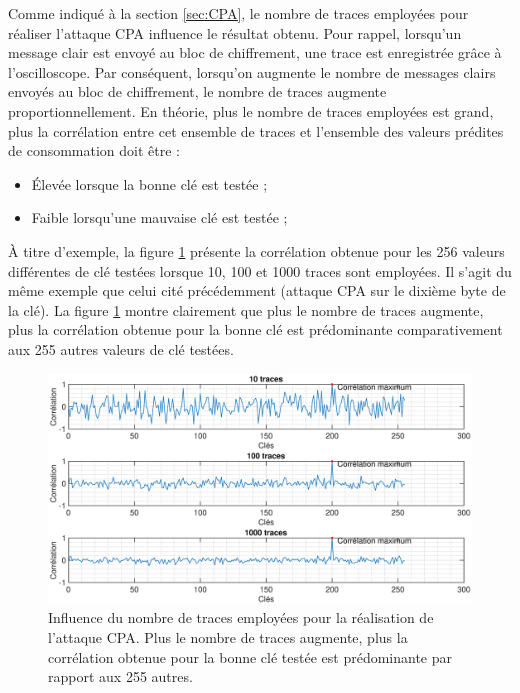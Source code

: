 \documentclass[oneside]{book}
\begin{document}
\newpage

Comme indiqué à la section \ref{sec:CPA}, le nombre de traces employées pour réaliser l'attaque CPA influence le résultat obtenu. Pour rappel, lorsqu'un message clair est envoyé au bloc de chiffrement, une trace est enregistrée grâce à l'oscilloscope. Par conséquent, lorsqu'on augmente le nombre de messages clairs envoyés au bloc de chiffrement, le nombre de traces augmente proportionnellement. En théorie, plus le nombre de traces employées est grand, plus la corrélation entre cet ensemble de traces et l'ensemble des valeurs prédites de consommation doit être :
\begin{itemize}
\item Élevée lorsque la bonne clé est testée ;
\item Faible lorsqu'une mauvaise clé est testée ;
\end{itemize}
À titre d'exemple, la figure \ref{fig:sim_nb_traces} présente la corrélation obtenue pour les 256 valeurs différentes de clé testées lorsque 10, 100 et 1000 traces sont employées. Il s'agit du même exemple que celui cité précédemment (attaque CPA sur le dixième byte de la clé). La figure \ref{fig:sim_nb_traces} montre clairement que plus le nombre de traces augmente, plus la corrélation obtenue pour la bonne clé est prédominante comparativement aux 255 autres valeurs de clé testées.

\begin{figure}[htbp]
    \hspace{-3.3cm}
    \includegraphics[scale=0.45]{image/sim_nb_traces}
    \caption{Influence du nombre de traces employées pour la réalisation de l'attaque CPA. Plus le nombre de traces augmente, plus la corrélation obtenue pour la bonne clé testée est prédominante par rapport aux 255 autres.}
    \label{fig:sim_nb_traces} 
\end{figure}
\end{document}
